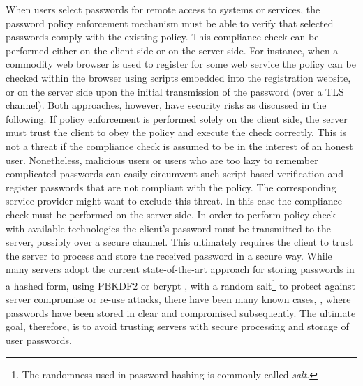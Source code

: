When users select passwords for remote access to systems or services, the password policy enforcement mechanism must be able to verify that selected passwords comply with the existing policy.
This compliance check can be performed either on the client side or on the server side.
For instance, when a commodity web browser is used to register for some web service the policy can be checked within the browser using scripts embedded into the registration website, or on the server side upon the initial transmission of the password (\eg over a \ac{TLS} channel).
Both approaches, however, have security risks as discussed in the following.
If policy enforcement is performed solely on the client side, the server must trust the client to obey the policy and execute the check correctly.
This is not a threat if the compliance check is assumed to be in the interest of an honest user.
Nonetheless, malicious users or users who are too lazy to remember complicated passwords can easily circumvent such script-based verification and register passwords that are not compliant with the policy. The corresponding service provider might want to exclude this threat.
In this case the compliance check must be performed on the server side.
In order to perform policy check with available technologies the client's password must be transmitted to the server, possibly over a secure channel.
This ultimately requires the client to trust the server to process and store the received password in a secure way.
While many servers adopt the current state-of-the-art approach for storing passwords in a hashed form, \eg using PBKDF2 \cite{rfc2898,nist800} or bcrypt \cite{ProvosM99}, with a random salt\footnote{The randomness used in password hashing is commonly called \emph{salt}.} to protect against server compromise or re-use attacks, there have been many known cases, \eg \cite{rockyouBreach,msBreach,cupidBreach}, where passwords have been stored in clear and compromised subsequently.
The ultimate goal, therefore, is to avoid trusting servers with secure processing and storage of user passwords.
